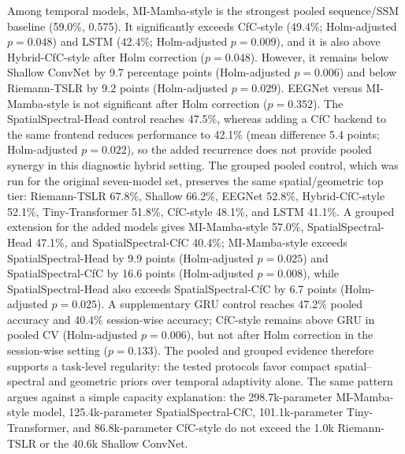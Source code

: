 \documentclass[journal]{IEEEtran}
\begin{document}
Among temporal models, MI-Mamba-style is the strongest pooled sequence/SSM baseline (59.0\%, 0.575). It significantly exceeds CfC-style (49.4\%; Holm-adjusted $p = 0.048$) and LSTM (42.4\%; Holm-adjusted $p = 0.009$), and it is also above Hybrid-CfC-style after Holm correction ($p = 0.048$). However, it remains below Shallow ConvNet by 9.7 percentage points (Holm-adjusted $p = 0.006$) and below Riemann-TSLR by 9.2 points (Holm-adjusted $p = 0.029$). EEGNet versus MI-Mamba-style is not significant after Holm correction ($p = 0.352$). The SpatialSpectral-Head control reaches 47.5\%, whereas adding a CfC backend to the same frontend reduces performance to 42.1\% (mean difference 5.4 points; Holm-adjusted $p = 0.022$), so the added recurrence does not provide pooled synergy in this diagnostic hybrid setting. The grouped pooled control, which was run for the original seven-model set, preserves the same spatial/geometric top tier: Riemann-TSLR 67.8\%, Shallow 66.2\%, EEGNet 52.8\%, Hybrid-CfC-style 52.1\%, Tiny-Transformer 51.8\%, CfC-style 48.1\%, and LSTM 41.1\%. A grouped extension for the added models gives MI-Mamba-style 57.0\%, SpatialSpectral-Head 47.1\%, and SpatialSpectral-CfC 40.4\%; MI-Mamba-style exceeds SpatialSpectral-Head by 9.9 points (Holm-adjusted $p=0.025$) and SpatialSpectral-CfC by 16.6 points (Holm-adjusted $p=0.008$), while SpatialSpectral-Head also exceeds SpatialSpectral-CfC by 6.7 points (Holm-adjusted $p=0.025$). A supplementary GRU control reaches 47.2\% pooled accuracy and 40.4\% session-wise accuracy; CfC-style remains above GRU in pooled CV (Holm-adjusted $p = 0.006$), but not after Holm correction in the session-wise setting ($p = 0.133$). The pooled and grouped evidence therefore supports a task-level regularity: the tested protocols favor compact spatial--spectral and geometric priors over temporal adaptivity alone. The same pattern argues against a simple capacity explanation: the 298.7k-parameter MI-Mamba-style model, 125.4k-parameter SpatialSpectral-CfC, 101.1k-parameter Tiny-Transformer, and 86.8k-parameter CfC-style do not exceed the 1.0k Riemann-TSLR or the 40.6k Shallow ConvNet.
\end{document}
